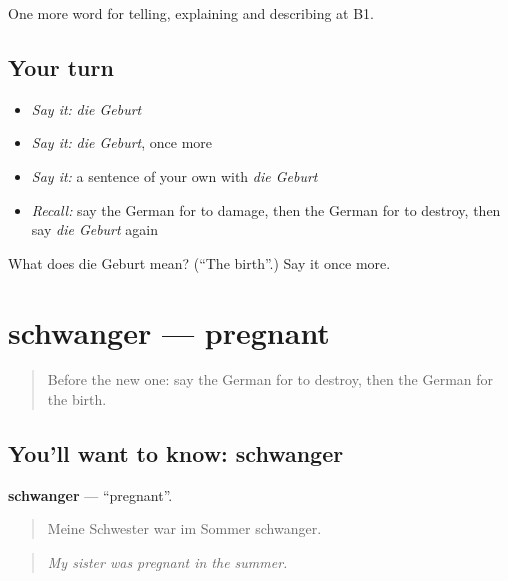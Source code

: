 \begin{grammarlens}[title={What you've built}]
One more word for telling, explaining and describing at B1.
\end{grammarlens}

\subsection*{Your turn}
\begin{itemize}
\raggedright
  \item \emph{Say it:} \emph{die Geburt}
  \item \emph{Say it:} \emph{die Geburt}, once more
  \item \emph{Say it:} a sentence of your own with \emph{die Geburt}
  \item \emph{Recall:} say the German for to damage, then the German for to destroy, then say \emph{die Geburt} again
\end{itemize}

\begin{tcolorbox}[breakable,colback=teal!4,colframe=teal!35!black,title={Before you move on}]
What does die Geburt mean? (\textquotedblleft{}The birth\textquotedblright{}.) Say it once more.
\end{tcolorbox}
\section[schwanger]{schwanger — pregnant}

\label{lesson:GE-C296-schwanger}



\begin{quote}
Before the new one: say the German for to destroy, then the German for the birth.
\end{quote}

\subsection*{You'll want to know: schwanger}
\textbf{schwanger} — \textquotedblleft{}pregnant\textquotedblright{}.

\begin{quote}
Meine Schwester war im Sommer schwanger.
\end{quote}

\begin{quote}
\emph{My sister was pregnant in the summer.}
\end{quote}


